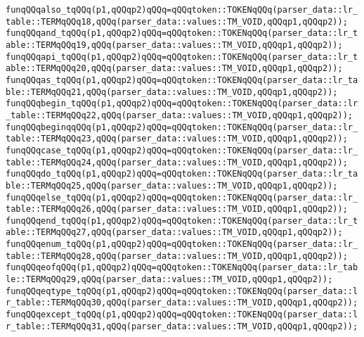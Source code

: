 \verb|funqQQqalso_tqQQq(p1,qQQqp2)qQQq=qQQqtoken::TOKENqQQq(parser_data::lr_table::TERMqQQq18,qQQq(parser_data::values::TM_VOID,qQQqp1,qQQqp2));|\newline
\verb|funqQQqand_tqQQq(p1,qQQqp2)qQQq=qQQqtoken::TOKENqQQq(parser_data::lr_table::TERMqQQq19,qQQq(parser_data::values::TM_VOID,qQQqp1,qQQqp2));|\newline
\verb|funqQQqapi_tqQQq(p1,qQQqp2)qQQq=qQQqtoken::TOKENqQQq(parser_data::lr_table::TERMqQQq20,qQQq(parser_data::values::TM_VOID,qQQqp1,qQQqp2));|\newline
\verb|funqQQqas_tqQQq(p1,qQQqp2)qQQq=qQQqtoken::TOKENqQQq(parser_data::lr_table::TERMqQQq21,qQQq(parser_data::values::TM_VOID,qQQqp1,qQQqp2));|\newline
\verb|funqQQqbegin_tqQQq(p1,qQQqp2)qQQq=qQQqtoken::TOKENqQQq(parser_data::lr_table::TERMqQQq22,qQQq(parser_data::values::TM_VOID,qQQqp1,qQQqp2));|\newline
\verb|funqQQqbeginqqQQq(p1,qQQqp2)qQQq=qQQqtoken::TOKENqQQq(parser_data::lr_table::TERMqQQq23,qQQq(parser_data::values::TM_VOID,qQQqp1,qQQqp2));|\newline
\verb|funqQQqcase_tqQQq(p1,qQQqp2)qQQq=qQQqtoken::TOKENqQQq(parser_data::lr_table::TERMqQQq24,qQQq(parser_data::values::TM_VOID,qQQqp1,qQQqp2));|\newline
\verb|funqQQqdo_tqQQq(p1,qQQqp2)qQQq=qQQqtoken::TOKENqQQq(parser_data::lr_table::TERMqQQq25,qQQq(parser_data::values::TM_VOID,qQQqp1,qQQqp2));|\newline
\verb|funqQQqelse_tqQQq(p1,qQQqp2)qQQq=qQQqtoken::TOKENqQQq(parser_data::lr_table::TERMqQQq26,qQQq(parser_data::values::TM_VOID,qQQqp1,qQQqp2));|\newline
\verb|funqQQqend_tqQQq(p1,qQQqp2)qQQq=qQQqtoken::TOKENqQQq(parser_data::lr_table::TERMqQQq27,qQQq(parser_data::values::TM_VOID,qQQqp1,qQQqp2));|\newline
\verb|funqQQqenum_tqQQq(p1,qQQqp2)qQQq=qQQqtoken::TOKENqQQq(parser_data::lr_table::TERMqQQq28,qQQq(parser_data::values::TM_VOID,qQQqp1,qQQqp2));|\newline
\verb|funqQQqeofqQQq(p1,qQQqp2)qQQq=qQQqtoken::TOKENqQQq(parser_data::lr_table::TERMqQQq29,qQQq(parser_data::values::TM_VOID,qQQqp1,qQQqp2));|\newline
\verb|funqQQqeqtype_tqQQq(p1,qQQqp2)qQQq=qQQqtoken::TOKENqQQq(parser_data::lr_table::TERMqQQq30,qQQq(parser_data::values::TM_VOID,qQQqp1,qQQqp2));|\newline
\verb|funqQQqexcept_tqQQq(p1,qQQqp2)qQQq=qQQqtoken::TOKENqQQq(parser_data::lr_table::TERMqQQq31,qQQq(parser_data::values::TM_VOID,qQQqp1,qQQqp2));|\newline
